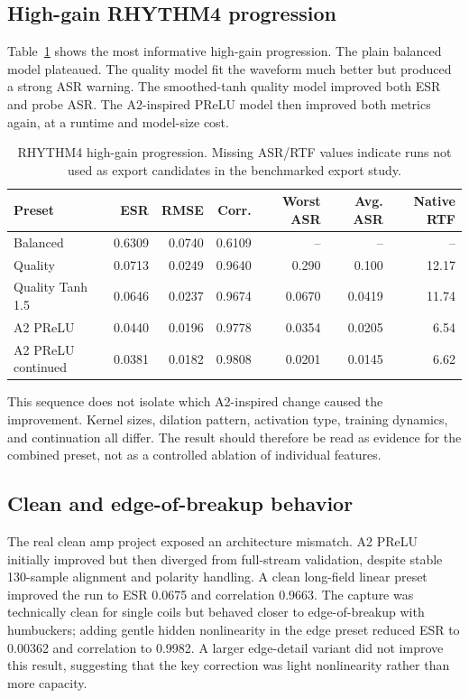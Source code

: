 \documentclass[11pt]{article}
\begin{document}
\subsection{High-gain RHYTHM4 progression}

Table~\ref{tab:rhythm4} shows the most informative high-gain progression. The
plain balanced model plateaued. The quality model fit the waveform much better
but produced a strong ASR warning. The smoothed-tanh quality model improved
both ESR and probe ASR. The A2-inspired PReLU model then improved both metrics
again, at a runtime and model-size cost.

\begin{table}[t]
\centering
\small
\begin{tabular}{@{}lrrrrrr@{}}
\toprule
Preset & ESR & RMSE & Corr. & Worst ASR & Avg. ASR & Native RTF \\
\midrule
Balanced & 0.6309 & 0.0740 & 0.6109 & -- & -- & -- \\
Quality & 0.0713 & 0.0249 & 0.9640 & 0.290 & 0.100 & 12.17 \\
Quality Tanh 1.5 & 0.0646 & 0.0237 & 0.9674 & 0.0670 & 0.0419 & 11.74 \\
A2 PReLU & 0.0440 & 0.0196 & 0.9778 & 0.0354 & 0.0205 & 6.54 \\
A2 PReLU continued & 0.0381 & 0.0182 & 0.9808 & 0.0201 & 0.0145 & 6.62 \\
\bottomrule
\end{tabular}
\caption{RHYTHM4 high-gain progression. Missing ASR/RTF values indicate runs
not used as export candidates in the benchmarked export study.}
\label{tab:rhythm4}
\end{table}

This sequence does not isolate which A2-inspired change caused the
improvement. Kernel sizes, dilation pattern, activation type, training dynamics,
and continuation all differ. The result should therefore be read as evidence
for the combined preset, not as a controlled ablation of individual features.

\subsection{Clean and edge-of-breakup behavior}

The real clean amp project exposed an architecture mismatch. A2 PReLU initially
improved but then diverged from full-stream validation, despite stable
130-sample alignment and polarity handling. A clean long-field linear preset
improved the run to ESR 0.0675 and correlation 0.9663. The capture was
technically clean for single coils but behaved closer to edge-of-breakup with
humbuckers; adding gentle hidden nonlinearity in the edge preset reduced ESR to
0.00362 and correlation to 0.9982. A larger edge-detail variant did not
improve this result, suggesting that the key correction was light nonlinearity
rather than more capacity.
\end{document}
